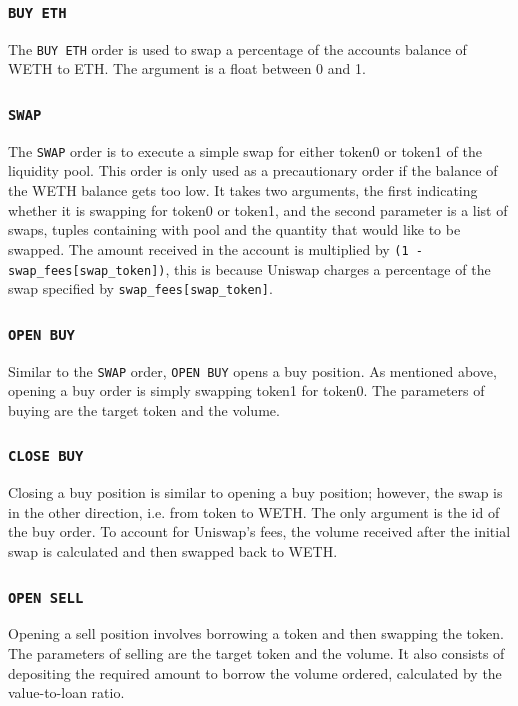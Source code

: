 \subsubsection{\texttt{BUY\ ETH}}
The \texttt{BUY\ ETH} order is used to swap a percentage of the accounts balance of WETH to ETH. The argument is a float between 0 and 1.

\subsubsection{\texttt{SWAP}}
The \texttt{SWAP} order is to execute a simple swap for either token0 or token1 of the liquidity pool. This order is only used as a precautionary order if the balance of the WETH balance gets too low. It takes two arguments, the first indicating whether it is swapping for token0 or token1, and the second parameter is a list of swaps, tuples containing with pool and the quantity that would like to be swapped. The amount received in the account is multiplied by \texttt{(1 - swap\_fees[swap\_token])}, this is because Uniswap charges a percentage of the swap specified by \texttt{swap\_fees[swap\_token]}.

\subsubsection{\texttt{OPEN\ BUY}}
Similar to the \texttt{SWAP} order, \texttt{OPEN\ BUY} opens a buy position. As mentioned above, opening a buy order is simply swapping token1 for token0. The parameters of buying are the target token and the volume. 

\subsubsection{\texttt{CLOSE\ BUY}}
Closing a buy position is similar to opening a buy position; however, the swap is in the other direction, i.e. from token to WETH. The only argument is the id of the buy order. To account for Uniswap's fees, the volume received after the initial swap is calculated and then swapped back to WETH.

\subsubsection{\texttt{OPEN\ SELL}}
Opening a sell position involves borrowing a token and then swapping the token. The parameters of selling are the target token and the volume. It also consists of depositing the required amount to borrow the volume ordered, calculated by the value-to-loan ratio.

